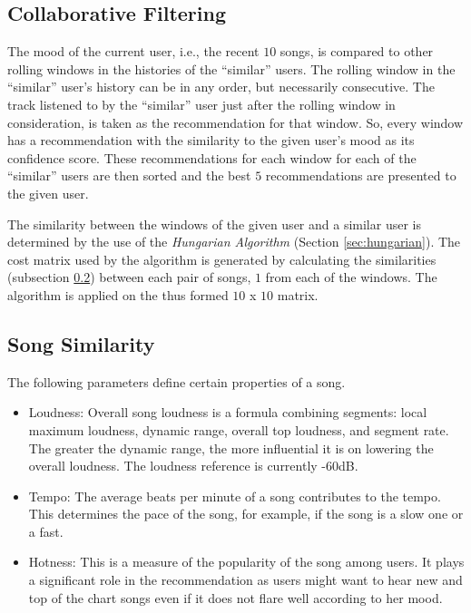 		\subsection{Collaborative Filtering}
			The mood of the current user, i.e., the recent \(10\) songs, is compared to other rolling windows in the histories of the ``similar'' users. The rolling window in the ``similar'' user's history can be in any order, but necessarily consecutive. The track listened to by the ``similar'' user just after the rolling window in consideration, is taken as the recommendation for that window. So, every window has a recommendation with the similarity to the given user's mood as its confidence score. These recommendations for each window for each of the ``similar'' users are then sorted and the best \(5\) recommendations are presented to the given user.
			
			The similarity between the windows of the given user and a similar user is determined by the use of the \emph{Hungarian Algorithm} (Section \ref{sec:hungarian}). The cost matrix used by the algorithm is generated by calculating the similarities (subsection \ref{subsec:song_similarity}) between each pair of songs, \(1\) from each of the windows. The algorithm is applied on the thus formed \(10\) x \(10\) matrix.
			
		\subsection{Song Similarity}
		\label{subsec:song_similarity}
			The following parameters define certain properties of a song.
\begin{itemize}
	\item Loudness: Overall song loudness is a formula combining segments: local maximum loudness, dynamic range, overall top loudness, and segment rate. The greater the dynamic range, the more influential it is on lowering the overall loudness. The loudness reference is currently -60dB.
	\item Tempo: The average beats per minute of a song contributes to the tempo. This determines the pace of the song, for example, if the song is a slow one or a fast.
	\item Hotness: This is a measure of the popularity of the song among users. It plays a significant role in the recommendation as users might want to hear new and top of the chart songs even if it does not flare well according to her mood.
\end{itemize}

